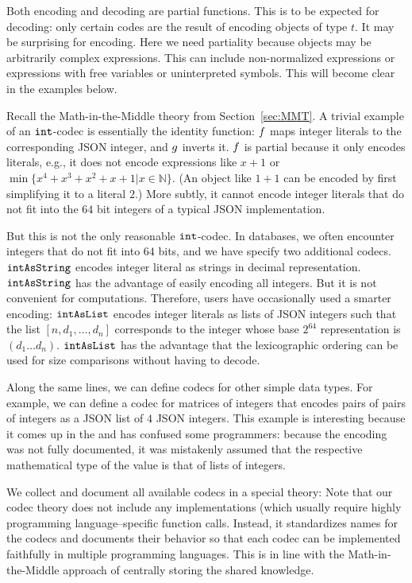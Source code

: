 Both encoding and decoding are partial functions.
This is to be expected for decoding: only certain codes are the result of encoding objects of type $t$.
It may be surprising for encoding.
Here we need partiality because \MMT objects may be arbitrarily complex expressions.
This can include non-normalized expressions or expressions with free variables or uninterpreted symbols.
This will become clear in the examples below.

Recall the Math-in-the-Middle theory from Section~\ref{sec:MMT}.
A trivial example of an $\Int$-codec is essentially the identity function: $\enc$ maps integer literals to the corresponding JSON integer, and $\dec$ inverts it.
$\enc$ is partial because it only encodes literals, e.g., it does not encode expressions like $x+1$ or $\min \{x^4+x^3+x^2+x+1|x\in \mathbb{N}\}$.
(An object like $1+1$ can be encoded by first simplifying it to a literal $2$.)
More subtly, it cannot encode integer literals that do not fit into the $64$ bit integers of a typical JSON implementation.

But this is not the only reasonable $\Int$-codec.
In \LMFDB databases, we often encounter integers that do not fit into $64$ bits, and we have specify two additional codecs.
$\intAsString$ encodes integer literal as strings in decimal representation.
$\intAsString$ has the advantage of easily encoding all integers.
But it is not convenient for computations.
Therefore, \LMFDB users have occasionally used a smarter encoding: $\intAsList$ encodes integer literals as lists of JSON integers such that the list $[n,d_1,\ldots,d_n]$ corresponds to the integer whose base $2^{64}$ representation is $(d_1\ldots d_n)$.
$\intAsList$ has the advantage that the lexicographic ordering can be used for size comparisons without having to decode.

Along the same lines, we can define codecs for other simple data types.
For example, we can define a codec for matrices of integers that encodes pairs of pairs of integers as a JSON list of $4$ JSON integers.
This example is interesting because it comes up in the \LMFDB and has confused some programmers: because the encoding was not fully documented, it was mistakenly assumed that the respective mathematical type of the value is that of lists of integers.

We collect and document all available codecs in a special \MMT theory:
Note that our codec theory does not include any implementations (which usually require highly programming language--specific function calls.
Instead, it standardizes names for the codecs and documents their behavior so that each codec can be implemented faithfully in multiple programming languages.
This is in line with the Math-in-the-Middle approach of centrally storing the shared knowledge.

